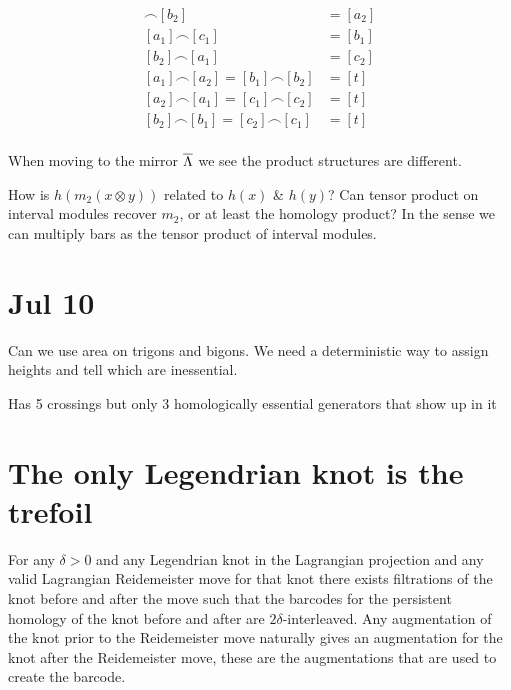 \documentclass[11pt,oneside]{amsart}
\begin{document}
    \begin{align*}
        [c_1]\frown [b_2]&=[a_2]\\
        [a_1]\frown[c_1]&=[b_1]\\
        [b_2]\frown [a_1]&=[c_2]\\
        [a_1]\frown [a_2]=[b_1]\frown [b_2]&=[t]\\
        [a_2]\frown [a_1]=[c_1]\frown [c_2]&=[t]\\
        [b_2]\frown [b_1]=[c_2]\frown [c_1]&=[t]\\
    \end{align*}

When moving to the mirror $\overline{\Lambda}$ we see the product structures are different.

\begin{question}
    How is $h(m_2(x\otimes y))$ related to $h(x)$ \& $h(y)$?
    Can tensor product on interval modules recover $m_2$, or at least the homology product? In the sense we can multiply bars as the tensor product of interval modules.
\end{question}



\section{Jul 10}

\begin{question}
    Can we use area on trigons and bigons. We need a deterministic way to assign heights and tell which are inessential.
\end{question}

Has 5 crossings but only 3 homologically essential generators that show up in it

\section{The only Legendrian knot is the trefoil}

\begin{theorem}

For any $\delta > 0$ and any Legendrian knot in the Lagrangian projection and any valid Lagrangian Reidemeister move for that knot there exists filtrations of the knot before and after the move such that the barcodes for the persistent homology of the knot before and after are $2\delta$-interleaved. Any augmentation of the knot prior to the Reidemeister move naturally gives an augmentation for the knot after the Reidemeister move, these are the augmentations that are used to create the barcode.

\end{theorem}
\end{document}
